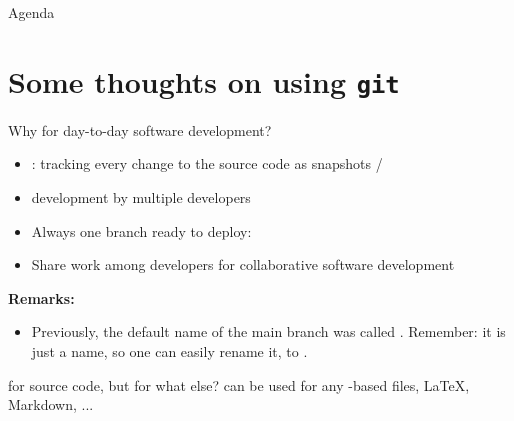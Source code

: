 \begin{frame}{Agenda}
\tableofcontents
\end{frame}

\section{Some thoughts on using \texttt{git}}

\begin{frame}{Why  for day-to-day software development?}
\begin{itemize}
\item {}: tracking every change to the source code as snapshots / 
\item {} development by multiple developers
\item Always one branch ready to deploy: 
\item Share work among developers for collaborative software development
\end{itemize}

\textbf{Remarks:}
\begin{itemize}
\item Previously, the default name of the main branch was called . Remember: it is just a name, so one can easily rename it, {\eg} to .
\end{itemize}

\begin{block}{ for source code, but for what else?}
 can be used for any -based files, {\eg} \LaTeX, Markdown, ...
\end{block}
\end{frame}

